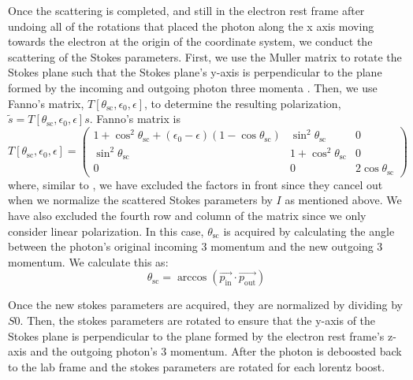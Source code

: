 \documentclass[12pt,a4paper]{article}
\begin{document}
Once the scattering is completed, and still in the electron rest frame after undoing all of the rotations that placed the photon along the x axis moving towards the electron at the origin of the coordinate system, we conduct the scattering of the Stokes parameters. First, we use the Muller matrix to rotate the Stokes plane such that the Stokes plane's y-axis is perpendicular to the plane formed by the incoming and outgoing photon three momenta \citep{McMaster:1961aa, lundman2014polarization}. Then, we use Fanno's matrix, $T[\theta_{\mathrm{sc}},\epsilon_{0}, \epsilon]$, \citep{McMaster:1961aa} to determine the resulting polarization, $\tilde{s}=T[\theta_{\mathrm{sc}},\epsilon_{0}, \epsilon]s$. Fanno's matrix is 
\begin{equation}
T[\theta_{\mathrm{sc}},\epsilon_{0}, \epsilon]=  \left(\begin{array}{lll}{1+\cos ^{2} \theta_{\mathrm{sc}}+\left(\epsilon_{0}-\epsilon \right)\left(1-\cos \theta_{\mathrm{sc}}\right)} & {\sin ^{2} \theta_{\mathrm{sc}}} & {0} \\ {\sin ^{2} \theta_{\mathrm{sc}}} & {1+\cos ^{2} \theta_{\mathrm{sc}}} & {0} \\ {0} & {0} & {2 \cos \theta_{\mathrm{sc}}}\end{array}\right)
\end{equation}
where, similar to \cite{krawczynski2011polarization},  we have excluded the factors in front since they cancel out when we normalize the scattered Stokes parameters by $I$ as mentioned above. We have also excluded the fourth row and column of the matrix since we only consider linear polarization. In this case, $\theta_{\mathrm{sc}}$ is acquired by calculating the angle between the photon's original incoming 3 momentum and the new outgoing 3 momentum. We calculate this as:
\begin{equation}
\theta_{\mathrm{sc}}=\arccos(\overrightarrow{p_\mathrm{in}} \cdot \overrightarrow{p_\mathrm{out}})
\end{equation}

Once the new stokes parameters are acquired, they are normalized by dividing by $S0$. Then, the stokes parameters are rotated to ensure that the y-axis of the Stokes plane is perpendicular to the plane formed by the electron rest frame's z-axis and the outgoing photon's 3 momentum. After the photon is deboosted back to the lab frame and the stokes parameters are rotated for each lorentz boost.
\end{document}
